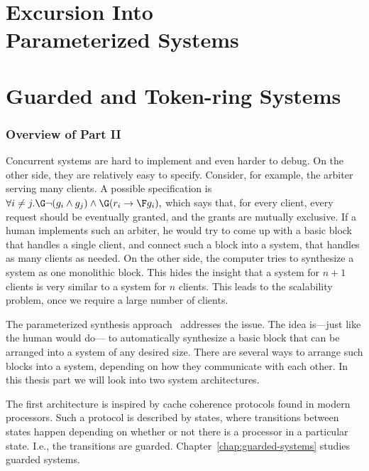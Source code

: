 \part[Excursion into Parameterized Systems]{Excursion Into\\Parameterized Systems\\ \ \\ \LARGE Guarded and Token-ring Systems}

\section*{Overview of Part II}

Concurrent systems are hard to implement and even harder to debug.
On the other side, they are relatively easy to specify.
Consider, for example, the arbiter serving many clients.
A possible specification is
$
  \forall i \neq j. \G \neg ( g_i \land g_j ) \land \G (r_i \impl \F g_i),
$
which says that, for every client, every request should be eventually granted,
and the grants are mutually exclusive.
If a human implements such an arbiter,
he would try to come up with a basic block that handles a single client,
and connect such a block into a system, that handles as many clients as needed.
On the other side,
the computer tries to synthesize a system as one monolithic block.
This hides the insight that
a system for $n+1$ clients is very similar to a system for $n$ clients.
This leads to the scalability problem, once we require a large number of clients.

The parameterized synthesis approach~\cite{JB14} addresses the issue.
The idea is---just like the human would do---%
to automatically synthesize a basic block that
can be arranged into a system of any desired size.
There are several ways to arrange such blocks into a system,
depending on how they communicate with each other.
In this thesis part we will look into two system architectures.

The first architecture is inspired by cache coherence protocols found in modern processors.
Such a protocol is described by states,
where transitions between states happen depending on whether or not there is a processor in a particular state.
I.e., the transitions are guarded.
Chapter~\ref{chap:guarded-systems} studies guarded systems.

